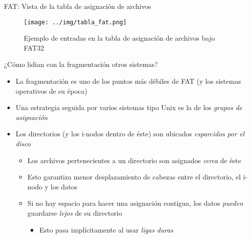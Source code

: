 \documentclass[presentation]{beamer}
\begin{document}
\begin{frame}[label={sec:org4b0444b}]{FAT: Vista de la tabla de asignación de archivos}
\begin{figure}[htbp]
\centering
\texttt{[image: ../img/tabla\_fat.png]}
\caption{Ejemplo de entradas en la tabla de asignación de archivos bajo FAT32}
\end{figure}
\end{frame}

\begin{frame}[label={sec:org7029425}]{¿Cómo lidian con la fragmentación otros sistemas?}
\begin{itemize}
\item La fragmentación es uno de los puntos más débiles de FAT (y los
sistemas operativos de su época)
\item Una estrategia seguida por varios sistemas tipo Unix es la de los
\emph{grupos de asignación}
\item Los directorios (y los i-nodos dentro de éste) son ubicados
\emph{esparcidos por el disco}
\begin{itemize}
\item Los archivos pertenecientes a un directorio son asignados \emph{cerca}
de éste
\item Esto garantiza menor desplazamiento de cabezas entre el
directorio, el i-nodo y los datos
\item Si no hay espacio para hacer una asignación contigua, los datos
\emph{pueden} guardarse \emph{lejos} de su directorio
\begin{itemize}
\item Esto pasa implícitamente al usar \emph{ligas duras}
\end{itemize}
\end{itemize}
\end{itemize}
\end{frame}
\end{document}

